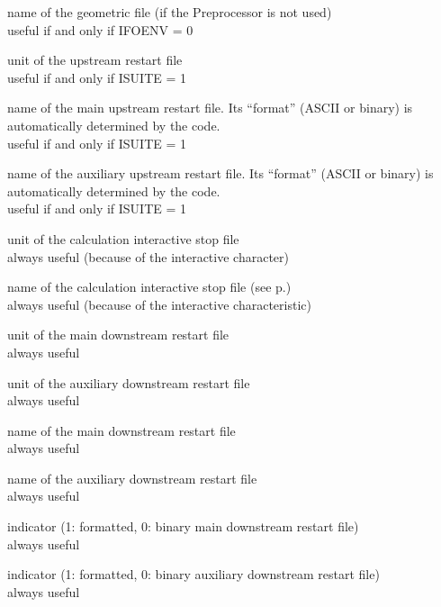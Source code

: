{name of the geometric file (if the Preprocessor is not used)\\
useful if and only if IFOENV = 0}

{unit of the upstream restart file\\ 
useful if and only if ISUITE = 1}

{name of the main upstream restart file. Its ``format'' (ASCII or binary)
is automatically determined by the code.\\
useful if and only if ISUITE = 1}

{name of the auxiliary upstream restart file. Its ``format'' (ASCII or binary)
is automatically determined by the code.\\
useful if and only if ISUITE = 1}

{unit of the calculation interactive stop file\\
always useful (because of the interactive character)}

{name of the calculation interactive stop file (see p.\pageref{prg_ficstp})\\
always useful (because of the interactive characteristic)}

{unit of the main downstream restart file\\
always useful}

{unit of the auxiliary downstream restart file\\
always useful}

{name of the main downstream restart file\\
always useful}

{name of the auxiliary downstream restart file\\
always useful}

{indicator (1: formatted, 0: binary main downstream restart file)\\
always useful}

{indicator (1: formatted, 0: binary auxiliary downstream restart file)\\
always useful}



